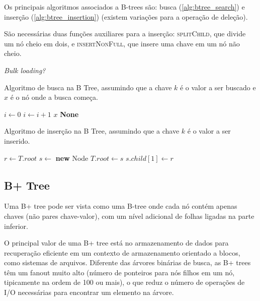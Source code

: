 Os principais algoritmos associados a B-trees são: busca (\cref{alg:btree_search}) e inserção (\cref{alg:btree_insertion}) (existem variações para a operação de deleção).

São necessárias duas funções auxiliares para a inserção: \textsc{splitChild}, que divide um nó cheio em dois, e \textsc{insertNonFull}, que insere uma chave em um nó não cheio.

\textit{Bulk loading?}

\begin{algorithm}
\caption{Algoritmo de busca na B Tree, assumindo que a chave $k$ é o valor a ser buscado e $x$ é o nó onde a busca começa.}
\label{alg:btree_search}
\begin{algorithmic}[1]
    \State $i \gets 0$
        \State $i \gets i + 1$
    \EndWhile
        \State \Return $x$
    \EndIf
        \State \Return \textbf{None}
    \EndIf
    \State \Return {}
\EndProcedure
\end{algorithmic}
\end{algorithm}

\begin{algorithm}
\caption{Algoritmo de inserção na B Tree, assumindo que a chave $k$ é o valor a ser inserido.}
\label{alg:btree_insertion}
\begin{algorithmic}[1]
    \State $r \gets T.root$
        \State $s \gets$ \textbf{new} Node
        \State $T.root \gets s$
        \State $s.child[1] \gets r$
        \State {}
        \State {}
    \Else
        \State {}
    \EndIf
\EndProcedure
\end{algorithmic}
\end{algorithm}

\cite{btree:wiki,btree:comer1979,btree:bayer1970}

\subsection{B+ Tree}

Uma B+ tree pode ser vista como uma B-tree onde cada nó contém apenas chaves (não pares chave-valor), com um nível adicional de folhas ligadas na parte inferior.

O principal valor de uma B+ tree está no armazenamento de dados para recuperação eficiente em um contexto de armazenamento orientado a blocos, como sistemas de arquivos. Diferente das árvores binárias de busca, as B+ trees têm um fanout muito alto (número de ponteiros para nós filhos em um nó, tipicamente na ordem de 100 ou mais), o que reduz o número de operações de I/O necessárias para encontrar um elemento na árvore.

